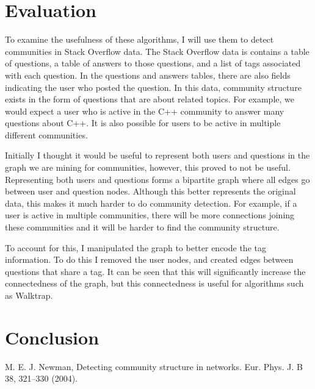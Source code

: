 \documentclass{article}
\begin{document}
\section{Evaluation}
To examine the usefulness of these algorithms, I will use them to detect communities in Stack Overflow data. The Stack Overflow data is contains a table of questions, a table of answers to those questions, and a list of tags associated with each question. In the questions and answers tables, there are also fields indicating the user who posted the question. In this data, community structure exists in the form of questions that are about related topics. For example, we would expect a user who is active in the C++ community to answer many questions about C++. It is also possible for users to be active in multiple different communities.
\par
Initially I thought it would be useful to represent both users and questions in the graph we are mining for communities, however, this proved to not be useful. Representing both users and questions forms a bipartite graph where all edges go between user and question nodes. Although this better represents the original data, this makes it much harder to do community detection. For example, if a user is active in multiple communities, there will be more connections joining these communities and it will be harder to find the community structure.
\par
To account for this, I manipulated the graph to better encode the tag information. To do this I removed the user nodes, and created edges between questions that share a tag. It can be seen that this will significantly increase the connectedness of the graph, but this connectedness is useful for algorithms such as Walktrap.

\section{Conclusion}

\begin{thebibliography}{16}

    M. E. J. Newman, Detecting community structure in networks. Eur. Phys. J. B 38, 321–330 (2004).

\end{thebibliography}
\end{document}
